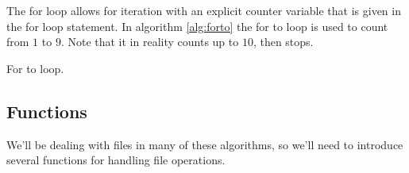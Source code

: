 The for loop allows for iteration with an explicit counter variable
that is given in the for loop statement. In algorithm \ref{alg:forto}
the for to loop is used to count from $1$ to $9$. Note that it in
reality counts up to $10$, then stops.

\begin{algorithm}
  \caption{For to loop.}
  \label{alg:forto}
  \begin{algorithmic}[1]
    \EndFor
  \end{algorithmic}
\end{algorithm}

\subsection{Functions}
\label{sec:pseudocode}

We'll be dealing with files in many of these algorithms, so we'll need
to introduce several functions for handling file operations.

